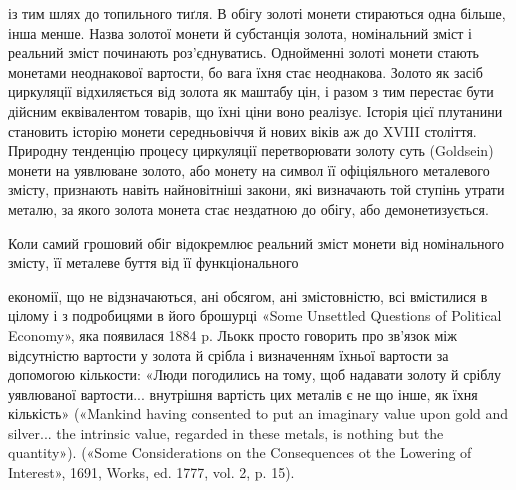 із тим шлях до топильного тиґля. В обігу золоті монети стираються
одна більше, інша менше. Назва золотої монети й субстанція
золота, номінальний зміст і реальний зміст починають роз’єднуватись.
Однойменні золоті монети стають монетами неоднакової
вартости, бо вага їхня стає неоднакова. Золото як засіб циркуляції
відхиляється від золота як маштабу цін, і разом з тим перестає
бути дійсним еквівалентом товарів, що їхні ціни воно реалізує.
Історія цієї плутанини становить історію монети середньовіччя
й нових віків аж до XVIII століття. Природну тенденцію процесу
циркуляції перетворювати золоту суть (Goldsein) монети на
уявлюване золото, або монету на символ її офіціяльного металевого
змісту, признають навіть найновітніші закони, які визначають
той ступінь утрати металю, за якого золота монета стає нездатною
до обігу, або демонетизується.

Коли самий грошовий обіг відокремлює реальний зміст монети
від номінального змісту, її металеве буття від її функціонального

економії, що не відзначаються, ані обсягом, ані змістовністю, всі вмістилися
в цілому і з подробицями в його брошурці «Some Unsettled Questions
of Political Economy», яка появилася 1884 p. Льокк просто говорить
про зв’язок між відсутністю вартости у золота й срібла і визначенням
їхньої вартости за допомогою кількости: «Люди погодились на тому, щоб
надавати золоту й сріблу уявлюваної вартости... внутрішня вартість цих
металів є не що інше, як їхня кількість» («Mankind having consented
to put an imaginary value upon gold and silver... the intrinsic value, regarded
in these metals, is nothing but the quantity»). («Some Considerations
on the Consequences ot the Lowering of Interest», 1691, Works, ed. 1777,
vol. 2, p. 15).
\parbreak{}  %

